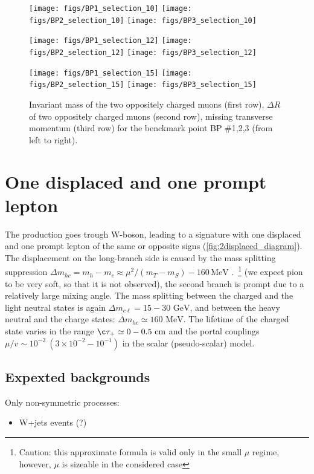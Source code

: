 \documentclass[12pt,letterpaper,notitlepage]{article}
\begin{document}
\begin{figure}[H]
\centering


\texttt{[image: figs/BP1\_selection\_10]}
\texttt{[image: figs/BP2\_selection\_10]}
\texttt{[image: figs/BP3\_selection\_10]}

\texttt{[image: figs/BP1\_selection\_12]}
\texttt{[image: figs/BP2\_selection\_12]}
\texttt{[image: figs/BP3\_selection\_12]}

\texttt{[image: figs/BP1\_selection\_15]}
\texttt{[image: figs/BP2\_selection\_15]}
\texttt{[image: figs/BP3\_selection\_15]}


\caption{\label{fig:inv_mass-PT_miss} Invariant mass of the two oppositely charged muons (first row), $\Delta R$ of two oppositely charged muons (second row), missing transverse momentum (third row) for the benckmark point BP \#1,2,3 (from left to right). }
\end{figure}

\section{One displaced and one prompt lepton}

The production goes trough W-boson, leading to a signature with one displaced and one prompt lepton of the same or opposite signs (\ref{fig:2displaced_diagram}). The displacement on the long-branch side is caused by the mass splitting suppression $\Delta m_{hc} = m_h - m_c \approx \mu^2/(m_T - m_S) - 160\,\text{MeV}$ .~\footnote{Caution: this approximate formula is valid only in the small $\mu$ regime, however, $\mu$ is sizeable in the considered case} (we expect pion to be very soft, so that it is not observed), the second branch is prompt due to a relatively large mixing angle. The mass splitting between the charged and the light neutral states is again $\Delta m_{c \ell} = 15-30 \text{ GeV}$, and between the heavy neutral and the charge states: $\Delta m_{h c} \simeq 160 \text{ MeV}$. The lifetime of the charged state varies in the range $\c \tau_+ \simeq 0-0.5 \text{ cm}$ and the portal couplings $\mu/v \sim 10^{-2}\ (3\times 10^{-2}-10^{-1})$ in the scalar (pseudo-scalar) model.

\subsection{Expexted backgrounds}
Only non-symmetric processes:
\begin{itemize}
  \item W+jets events (?)
\end{itemize}
\end{document}
